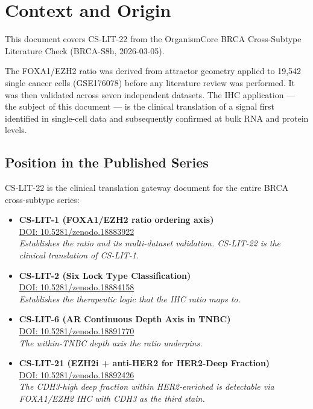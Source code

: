 \documentclass[12pt, a4paper]{article}
\begin{document}
\tableofcontents
\newpage

\section{Context and Origin}

This document covers CS-LIT-22 from the OrganismCore
BRCA Cross-Subtype Literature Check
(BRCA-S8h, 2026-03-05).

The FOXA1/EZH2 ratio was derived from attractor
geometry applied to 19,542 single cancer cells
(GSE176078) before any literature review was
performed. It was then validated across seven
independent datasets. The IHC application --- the
subject of this document --- is the clinical
translation of a signal first identified in
single-cell data and subsequently confirmed
at bulk RNA and protein levels.

\subsection{Position in the Published Series}

CS-LIT-22 is the clinical translation gateway
document for the entire BRCA cross-subtype
series:

\begin{itemize}
    \item \textbf{CS-LIT-1 (FOXA1/EZH2 ratio
    ordering axis)}\\
    \href{https://doi.org/10.5281/zenodo.18883922}
    {DOI: 10.5281/zenodo.18883922}\\
    \textit{Establishes the ratio and its
    multi-dataset validation. CS-LIT-22 is the
    clinical translation of CS-LIT-1.}

    \item \textbf{CS-LIT-2 (Six Lock Type
    Classification)}\\
    \href{https://doi.org/10.5281/zenodo.18884158}
    {DOI: 10.5281/zenodo.18884158}\\
    \textit{Establishes the therapeutic logic
    that the IHC ratio maps to.}

    \item \textbf{CS-LIT-6 (AR Continuous Depth
    Axis in TNBC)}\\
    \href{https://doi.org/10.5281/zenodo.18891770}
    {DOI: 10.5281/zenodo.18891770}\\
    \textit{The within-TNBC depth axis the ratio
    underpins.}

    \item \textbf{CS-LIT-21 (EZH2i + anti-HER2
    for HER2-Deep Fraction)}\\
    \href{https://doi.org/10.5281/zenodo.18892426}
    {DOI: 10.5281/zenodo.18892426}\\
    \textit{The CDH3-high deep fraction within
    HER2-enriched is detectable via FOXA1/EZH2
    IHC with CDH3 as the third stain.}
\end{itemize}
\end{document}
